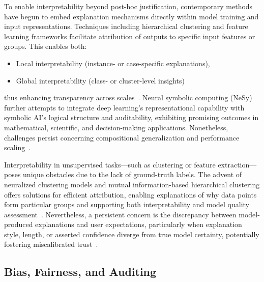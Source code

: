 To enable interpretability beyond post-hoc justification, contemporary methods have begun to embed explanation mechanisms directly within model training and input representations. Techniques including hierarchical clustering and feature learning frameworks facilitate attribution of outputs to specific input features or groups. This enables both:
\begin{itemize}
    \item Local interpretability (instance- or case-specific explanations),
    \item Global interpretability (class- or cluster-level insights)
\end{itemize}
thus enhancing transparency across scales~\cite{ref36, ref52, ref83}. Neural symbolic computing (NeSy) further attempts to integrate deep learning’s representational capability with symbolic AI’s logical structure and auditability, exhibiting promising outcomes in mathematical, scientific, and decision-making applications. Nonetheless, challenges persist concerning compositional generalization and performance scaling~\cite{ref19, ref35, ref73, ref84}.

Interpretability in unsupervised tasks---such as clustering or feature extraction---poses unique obstacles due to the lack of ground-truth labels. The advent of neuralized clustering models and mutual information-based hierarchical clustering offers solutions for efficient attribution, enabling explanations of why data points form particular groups and supporting both interpretability and model quality assessment~\cite{ref45, ref52, ref84}. Nevertheless, a persistent concern is the discrepancy between model-produced explanations and user expectations, particularly when explanation style, length, or asserted confidence diverge from true model certainty, potentially fostering miscalibrated trust~\cite{ref49, ref81}.

\subsection{Bias, Fairness, and Auditing}

